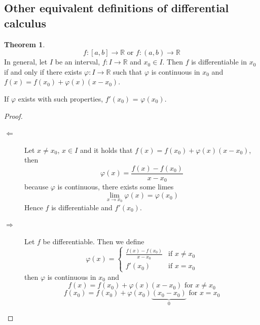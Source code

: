 \documentclass[a4paper,landscape,twocolumn]{article}
\theoremstyle{definition}
\newtheorem{theorem}{Theorem}
\begin{document}
\subsection{Other equivalent definitions of differential calculus}
%
\begin{theorem}
  \[ f: [a,b] \to \mathbb R \text{ or } f: (a, b) \to \mathbb R \]
  In general, let $I$ be an interval, $f: I \to \mathbb R$
  and $x_0 \in I$. Then $f$ is differentiable in $x_0$ if and only if
  there exists $\varphi: I \to \mathbb R$ such that $\varphi$ is continuous in $x_0$
  and $f(x) = f(x_0) + \varphi(x)(x - x_0)$.

  If $\varphi$ exists with such properties, $f'(x_0)$ = $\varphi(x_0)$.
\end{theorem}
\begin{proof}
  \begin{description}
    \item[$\Leftarrow$]
      Let $x \neq x_0$, $x \in I$ and it holds that $f(x) = f(x_0) + \varphi(x)(x - x_0)$, then
      \[ \varphi(x) = \frac{f(x) - f(x_0)}{x - x_0} \]
      because $\varphi$ is continuous, there exists some limes
      \[ \lim_{x \to x_0} \varphi(x) = \varphi(x_0) \]
      Hence $f$ is differentiable and $f'(x_0)$.
    \item[$\Rightarrow$]
      Let $f$ be differentiable. Then we define
      \[
        \varphi(x) = \begin{cases}
          \frac{f(x) - f(x_0)}{x - x_0} & \text{if } x \neq x_0 \\
          f'(x_0) & \text{if } x = x_0
        \end{cases}
      \]
      then $\varphi$ is continuous in $x_0$ and
      \[ f(x) = f(x_0) + \varphi(x)(x - x_0) \text{ for } x \neq x_0 \]
      \[ f(x_0) = f(x_0) + \varphi(x_0)\underbrace{(x_0 - x_0)}_{0} \text{ for } x = x_0 \]
  \end{description}
\end{proof}
\end{document}
